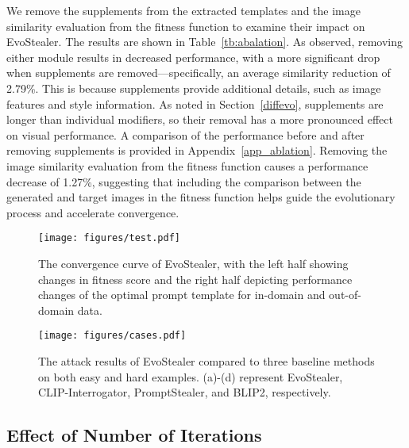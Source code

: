 We remove the supplements from the extracted templates and the image similarity evaluation from the fitness function to examine their impact on EvoStealer. The results are shown in Table~\ref{tb:abalation}. As observed, removing either module results in decreased performance, with a more significant drop when supplements are removed—specifically, an average similarity reduction of 2.79\%. This is because supplements provide additional details, such as image features and style information. As noted in Section~\ref{diffevo}, supplements are longer than individual modifiers, so their removal has a more pronounced effect on visual performance. A comparison of the performance before and after removing supplements is provided in Appendix~\ref{app_ablation}. Removing the image similarity evaluation from the fitness function causes a performance decrease of 1.27\%, suggesting that including the comparison between the generated and target images in the fitness function helps guide the evolutionary process and accelerate convergence.
\begin{figure}[h!]
    \centering
    \texttt{[image: figures/test.pdf]}
    \caption{The convergence curve of EvoStealer, with the left half showing changes in fitness score and the right half depicting performance changes of the optimal prompt template for in-domain and out-of-domain data.}
    \label{fig:iters}
\end{figure}

\begin{figure*}[h!]
    \centering
    \texttt{[image: figures/cases.pdf]}
    \caption{The attack results of EvoStealer compared to three baseline methods on both easy and hard examples. (a)-(d) represent EvoStealer, CLIP-Interrogator, PromptStealer, and BLIP2, respectively.}
    \label{fig:case}
\end{figure*}
\subsection{Effect of Number of Iterations}

